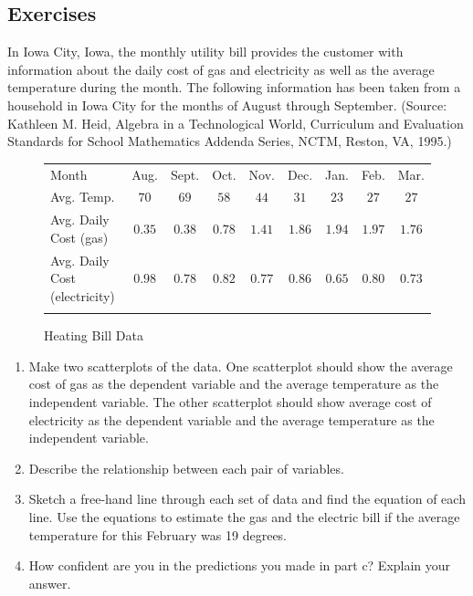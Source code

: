 \documentclass[10pt,]{book}
\theoremstyle{ptxdefinitionnotitle}
\theoremstyle{ptxdefinitiontitle}
\numberwithin{equation}{section}
\newcommand{\hrulemedium}{\noalign{\hrule height 0.07em}}
\begin{document}
\subsection*{Exercises}\hypertarget{exercises-4}{}
\begin{divisionexercise}{1}\hypertarget{exercise-9}{}
\hypertarget{p-97}{}%
In Iowa City, Iowa, the monthly utility bill provides the customer with information about the daily cost of gas and electricity as well as the average temperature during the month. The following information has been taken from a household in Iowa City for the months of August through September. (Source: Kathleen M. Heid, Algebra in a Technological World, Curriculum and Evaluation Standards for School Mathematics Addenda Series, NCTM, Reston, VA, 1995.) \leavevmode%
\begin{figure}
\centering
\begin{tabular}{lllllllll}\hrulemedium
Month&\multicolumn{1}{c}{Aug.}&\multicolumn{1}{c}{Sept.}&\multicolumn{1}{c}{Oct.}&\multicolumn{1}{c}{Nov.}&\multicolumn{1}{c}{Dec.}&\multicolumn{1}{c}{Jan.}&\multicolumn{1}{c}{Feb.}&\multicolumn{1}{c}{Mar.}\tabularnewline\hrulemedium
Avg. Temp.&\multicolumn{1}{c}{\(70\)}&\multicolumn{1}{c}{\(69\)}&\multicolumn{1}{c}{\(58\)}&\multicolumn{1}{c}{\(44\)}&\multicolumn{1}{c}{\(31\)}&\multicolumn{1}{c}{\(23\)}&\multicolumn{1}{c}{\(27\)}&\multicolumn{1}{c}{\(27\)}\tabularnewline\hrulemedium
Avg. Daily Cost (gas)&\multicolumn{1}{c}{\(0.35\)}&\multicolumn{1}{c}{\(0.38\)}&\multicolumn{1}{c}{\(0.78\)}&\multicolumn{1}{c}{\(1.41\)}&\multicolumn{1}{c}{\(1.86\)}&\multicolumn{1}{c}{\(1.94\)}&\multicolumn{1}{c}{\(1.97\)}&\multicolumn{1}{c}{\(1.76\)}\tabularnewline\hrulemedium
Avg. Daily Cost (electricity)&\multicolumn{1}{c}{\(0.98\)}&\multicolumn{1}{c}{\(0.78\)}&\multicolumn{1}{c}{\(0.82\)}&\multicolumn{1}{c}{\(0.77\)}&\multicolumn{1}{c}{\(0.86\)}&\multicolumn{1}{c}{\(0.65\)}&\multicolumn{1}{c}{\(0.80\)}&\multicolumn{1}{c}{\(0.73\)}\tabularnewline\hrulemedium
\end{tabular}
\caption{Heating Bill Data\label{heating-bill-data}}
\end{figure}
 \leavevmode%
\begin{enumerate}[label=(\alph*)]
\item\hypertarget{li-10}{}Make two scatterplots of the data. One scatterplot should show the average cost of gas as the dependent variable and the average temperature as the independent variable. The other scatterplot should show average cost of electricity as the dependent variable and the average temperature as the independent variable.%
\item\hypertarget{li-11}{}Describe the relationship between each pair of variables.%
\item\hypertarget{li-12}{}Sketch a free-hand line through each set of data and find the equation of each line. Use the equations to estimate the gas and the electric bill if the average temperature for this February was 19 degrees.%
\item\hypertarget{li-13}{}How confident are you in the predictions you made in part c? Explain your answer.%
\end{enumerate}
%
\end{divisionexercise}%
\end{document}
